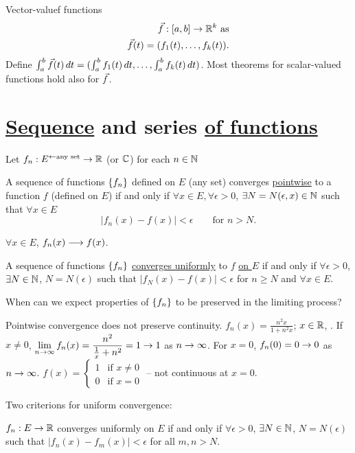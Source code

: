 \documentclass[]{article}
\begin{document}
Vector-valuef functions
\begin{align*}
	\vec{f}:[a,b]\rightarrow\mathbb{R}^k \text{ as} \\
	\vec{f}(t) = (f_1(t),\dots,f_k(t)).
\end{align*}
Define $\int_a^b \vec{f}(t)\,dt = (\int_a^bf_1(t)\,dt,\dots,\int_a^bf_k(t)\,dt)$.
Most theorems for scalar-valued functions hold also for $\vec{f}$.

\section*{\ul{Sequence} and series \ul{of functions}}

Let $f_n:E^{\leftarrow\text{any set}}\rightarrow\mathbb{R}$ (or $\mathbb{C}$) for each $n\in\mathbb{N}$
\begin{definition}
	A sequence of functions $\left\{ f_n \right\}$ defined on $E$ (any set) converges \ul{pointwise} to a function $f$ (defined on $E$) if and only if $\forall x\in E,\forall\epsilon>0$, $\exists N=N(\epsilon,x)\in\mathbb{N}$ such that $\forall x\in E$
	$$ |f_n(x)-f(x)| < \epsilon \qquad \text{for }n>N. $$
\end{definition}
\begin{remark}
	$\forall x\in E$, $f_n(x)\longrightarrow f(x)$.
\end{remark}
\begin{definition}
	A sequence of functions $\left\{ f_n \right\}$ \ul{converges uniformly} to $f$ \ul{on $E$} if and only if $\forall\epsilon>0$, $\exists N\in\mathbb{N}$, $N=N(\epsilon)$ such that $|f_N(x)-f(x)| < \epsilon$ for $n\geq N$ and $\forall x\in E$.
\end{definition}
When can we expect properties of $\left\{ f_n \right\}$ to be preserved in the limiting process?
\begin{example}
	Pointwise convergence does not preserve continuity.
	$f_n(x) = \frac{n^2x}{1+n^2x}$; $x\in\mathbb{R}$, .
	If $x\neq0$, $\displaystyle\lim_{n\rightarrow\infty} f_n(x) = \frac{n^2}{\frac1x+n^2} = 1\rightarrow 1$ as $n\rightarrow\infty$.
	For $x=0$, $f_n(0)=0\rightarrow0$ as $n\rightarrow\infty$.
	$f(x) = \begin{cases} 1 & \text{if }x\neq0 \\ 0 & \text{if }x=0 \end{cases}$ -- not continuous at $x=0$.
\end{example}

Two criterions for uniform convergence:
\begin{theorem}
	\label{thm-7-8}
	$f_n:E\rightarrow\mathbb{R}$ converges uniformly on $E$ if and only if $\forall\epsilon>0$, $\exists N\in\mathbb{N}$, $N=N(\epsilon)$ such that $|f_n(x)-f_m(x)|<\epsilon$ for all $m,n> N$.
\end{theorem}
\end{document}
